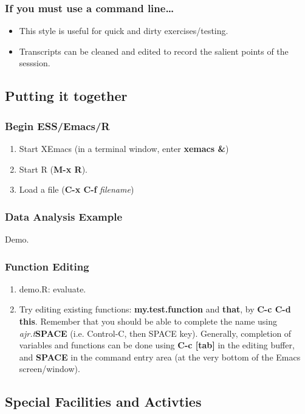 \documentclass{beamer}
\begin{document}
\begin{frame}
  \frametitle{If you must use a command line\ldots}
  \begin{itemize}
  \item This style is useful for quick and dirty exercises/testing.
  \item Transcripts can be cleaned and edited to record the salient
    points of the sesssion.
  \end{itemize}
\end{frame}

\subsection{Putting it together}

\begin{frame}
  \frametitle{Begin ESS/Emacs/R}
  \begin{enumerate}
  \item Start XEmacs  (in a terminal window, enter \textbf{xemacs \&})
  \item Start R (\textbf{M-x R}).
  \item Load a file (\textbf{C-x C-f} \textit{filename})
  \end{enumerate}
\end{frame}

\begin{frame}[fragile]
  \frametitle{Data Analysis Example}
  Demo.
\end{frame}

\begin{frame}[fragile] \frametitle{Function Editing}
  \begin{enumerate}
  \item demo.R: evaluate.
  \item Try editing existing functions: \textbf{my.test.function} and
    \textbf{that}, by \textbf{C-c C-d this}.  Remember that you should
    be able to complete the name using \textit{ajr.t}\textbf{SPACE}
    (i.e.  Control-C, then SPACE key).  Generally, completion of
    variables and functions can be done using \textbf{C-c [tab]} in the
    editing buffer, and \textbf{SPACE} in the command entry area (at
    the very bottom of the Emacs screen/window).
  \end{enumerate}
\end{frame}

\subsection{Special Facilities and Activties}
\end{document}
